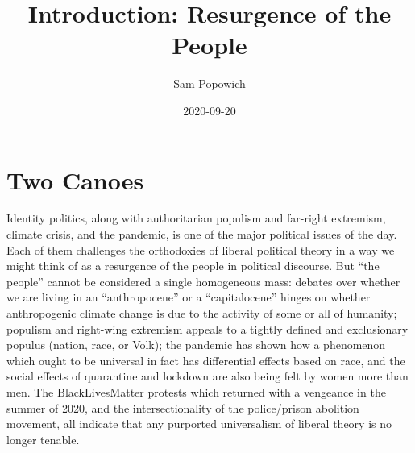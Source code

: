 \documentclass[12pt,oneside]{memoir}
\title{Introduction: Resurgence of the People}
\author{Sam Popowich}
\date{2020-09-20}
\begin{document}
\maketitle
\clearpage

\newpage
\setcounter{page}{1}

\mainmatter

\section*{Two Canoes}

Identity politics, along with authoritarian populism and far-right extremism, climate crisis, and the pandemic, is one of the major political issues of the day. Each of them challenges the orthodoxies of liberal political theory in a way we might think of as a resurgence of the people in political discourse. But ``the people'' cannot be considered a single homogeneous mass: debates over whether we are living in an ``anthropocene'' or a ``capitalocene'' \citep{Moore2016} hinges on whether anthropogenic climate change is due to the activity of some or all of humanity; populism  and right-wing extremism appeals to a tightly defined and exclusionary populus (nation, race, or Volk); the pandemic has shown how a phenomenon which ought to be universal in fact has differential effects based on race, and the social effects of quarantine and lockdown are also being felt by women more than men. The BlackLivesMatter protests which returned with a vengeance in the summer of 2020, and the intersectionality of the police/prison abolition movement, all indicate that any purported universalism of liberal theory is no longer tenable.
\end{document}
